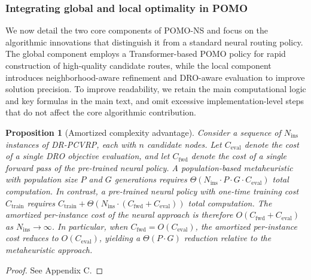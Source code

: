 \documentclass[preprint,12pt,authoryear]{elsarticle}
\newtheorem{proposition}{Proposition}
\theoremstyle{definition}
\begin{document}
\subsubsection{Integrating global and local optimality in POMO}


We now detail the two core components of POMO-NS and focus on the algorithmic innovations that distinguish it from a standard neural routing policy. The global component employs a Transformer-based POMO policy for rapid construction of high-quality candidate routes, while the local component introduces neighborhood-aware refinement and DRO-aware evaluation to improve solution precision. To improve readability, we retain the main computational logic and key formulas in the main text, and omit excessive implementation-level steps that do not affect the core algorithmic contribution.

\begin{proposition}[Amortized complexity advantage]\label{prop2}
Consider a sequence of $N_{\mathrm{ins}}$ instances of DR-PCVRP, each with $n$ candidate nodes. Let $C_{\mathrm{eval}}$ denote the cost of a single DRO objective evaluation, and let $C_{\mathrm{fwd}}$ denote the cost of a single forward pass of the pre-trained neural policy. A population-based metaheuristic with population size $P$ and $G$ generations requires $\Theta(N_{\mathrm{ins}} \cdot P \cdot G \cdot C_{\mathrm{eval}})$ total computation. In contrast, a pre-trained neural policy with one-time training cost $C_{\mathrm{train}}$ requires $C_{\mathrm{train}} + \Theta(N_{\mathrm{ins}} \cdot (C_{\mathrm{fwd}} + C_{\mathrm{eval}}))$ total computation. The amortized per-instance cost of the neural approach is therefore $O(C_{\mathrm{fwd}} + C_{\mathrm{eval}})$ as $N_{\mathrm{ins}} \to \infty$. In particular, when $C_{\mathrm{fwd}} = O(C_{\mathrm{eval}})$, the amortized per-instance cost reduces to $O(C_{\mathrm{eval}})$, yielding a $\Theta(P \cdot G)$ reduction relative to the metaheuristic approach.
\end{proposition}
\begin{proof}
See Appendix C.
\end{proof}
\end{document}
